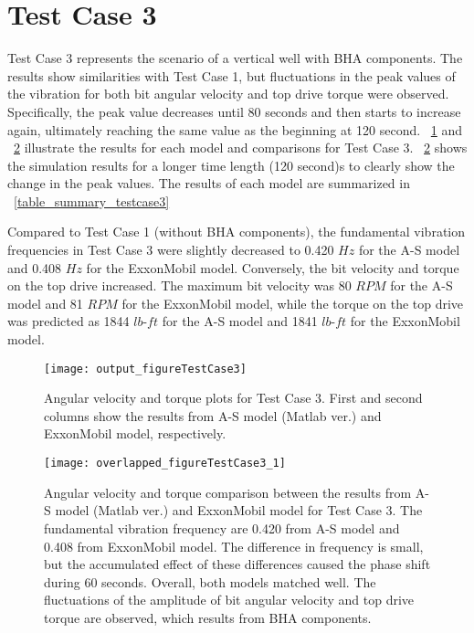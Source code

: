 \section{Test Case 3}
 Test Case 3 represents the scenario of a vertical well with BHA components. The results show similarities with Test Case 1, but fluctuations in the peak values of the vibration for both bit angular velocity and top drive torque were observed. Specifically, the peak value decreases until 80 seconds and then starts to increase again, ultimately reaching the same value as the beginning at 120 second. \figurename~\ref{figure_testcase3} and \figurename~\ref{figure_testcase3_overlapped} illustrate the results for each model and comparisons for Test Case 3. \figurename~\ref{figure_testcase3_overlapped} shows the simulation results for a longer time length (120 second)s to clearly show the change in the peak values. The results of each model are summarized in \tablename~\ref{table_summary_testcase3}

Compared to Test Case 1 (without BHA components), the fundamental vibration frequencies in Test Case 3 were slightly decreased to 0.420 $Hz$ for the A-S model and 0.408 $Hz$ for the ExxonMobil model. Conversely, the bit velocity and torque on the top drive increased. The maximum bit velocity was 80 $RPM$ for the A-S model and 81 $RPM$ for the ExxonMobil model, while the torque on the top drive was predicted as 1844 $lb\mbox{-}ft$ for the A-S model and 1841 $lb\mbox{-}ft$ for the ExxonMobil model.

\begin{figure}
  \centering
  \texttt{[image: output\_figureTestCase3]}
  \caption[Angular velocity and torque plots for Test Case 3]{Angular velocity and torque plots for Test Case 3. First and second columns show the results from A-S model (Matlab ver.) and ExxonMobil model, respectively.}\label{figure_testcase3}
\end{figure}
\begin{figure}
  \centering
  \texttt{[image: overlapped\_figureTestCase3\_1]}
  \caption[Angular velocity and torque comparison plots for Test Case 3]{Angular velocity and torque comparison between the results from A-S model (Matlab ver.) and ExxonMobil model for Test Case 3. The fundamental vibration frequency are 0.420 from A-S model and 0.408 from ExxonMobil model. The difference in frequency is small, but the accumulated effect of these differences caused the phase shift during 60 seconds. Overall, both models matched well. The fluctuations of the amplitude of bit angular velocity and top drive torque are observed, which results from BHA components.}\label{figure_testcase3_overlapped}
\end{figure}

